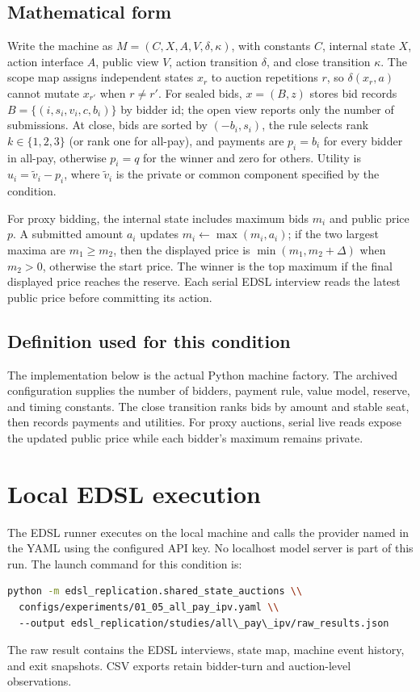 \documentclass[11pt]{article}
\begin{document}
\subsection{Mathematical form}
Write the machine as $M=(C,X,A,V,\delta,\kappa)$, with constants $C$,
internal state $X$, action interface $A$, public view $V$, action transition
$\delta$, and close transition $\kappa$. The scope map assigns independent
states $x_r$ to auction repetitions $r$, so $\delta(x_r,a)$ cannot mutate
$x_{r'}$ when $r\ne r'$. For sealed bids, $x=(B,z)$ stores bid records
$B=\{(i,s_i,v_i,c,b_i)\}$ by bidder id; the open view reports only the
number of submissions. At close, bids are sorted by $(-b_i,s_i)$, the rule
selects rank $k\in\{1,2,3\}$ (or rank one for all-pay), and payments are
$p_i=b_i$ for every bidder in all-pay, otherwise $p_i=q$ for the winner and
zero for others. Utility is $u_i=\tilde v_i-p_i$, where $\tilde v_i$ is
the private or common component specified by the condition.

For proxy bidding, the internal state includes maximum bids $m_i$ and public
price $p$. A submitted amount $a_i$ updates $m_i\leftarrow\max(m_i,a_i)$;
if the two largest maxima are $m_1\ge m_2$, then the displayed price
is $\min(m_1,m_2+\Delta)$ when $m_2>0$, otherwise the start
price. The winner is the top maximum if the final displayed price reaches the
reserve. Each serial EDSL interview reads the latest public price before
committing its action.

\subsection{Definition used for this condition}
The implementation below is the actual Python machine factory. The archived
configuration supplies the number of bidders, payment rule, value model, reserve,
and timing constants. The close transition ranks bids by amount and stable seat,
then records payments and utilities. For proxy auctions, serial live reads expose
the updated public price while each bidder's maximum remains private.


\section{Local EDSL execution}
The EDSL runner executes on the local machine and calls the provider named in the
YAML using the configured API key. No localhost model server is part of this run.
The launch command for this condition is:
\begin{lstlisting}[language=bash]
python -m edsl_replication.shared_state_auctions \\
  configs/experiments/01_05_all_pay_ipv.yaml \\
  --output edsl_replication/studies/all\_pay\_ipv/raw_results.json
\end{lstlisting}
The raw result contains the EDSL interviews, state map, machine event history, and
exit snapshots. CSV exports retain bidder-turn and auction-level observations.
\end{document}
